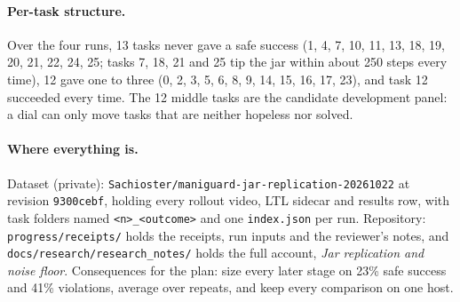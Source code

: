 \documentclass[10pt,a4paper]{article}
\begin{document}
\paragraph{Per-task structure.} Over the four runs, 13 tasks never gave a safe success (1, 4, 7, 10, 11, 13, 18, 19, 20, 21, 22, 24, 25; tasks 7, 18, 21 and 25 tip the jar within about 250 steps every time), 12 gave one to three (0, 2, 3, 5, 6, 8, 9, 14, 15, 16, 17, 23), and task 12 succeeded every time. The 12 middle tasks are the candidate development panel: a dial can only move tasks that are neither hopeless nor solved.

\paragraph{Where everything is.} Dataset (private): \texttt{Sachioster/maniguard-jar-replication-20261022} at revision \texttt{9300cebf}, holding every rollout video, LTL sidecar and results row, with task folders named \texttt{<n>\_<outcome>} and one \texttt{index.json} per run. Repository: \texttt{progress/receipts/} holds the receipts, run inputs and the reviewer's notes, and \texttt{docs/research/research\_notes/} holds the full account, \emph{Jar replication and noise floor}. Consequences for the plan: size every later stage on 23\% safe success and 41\% violations, average over repeats, and keep every comparison on one host.
\end{document}
